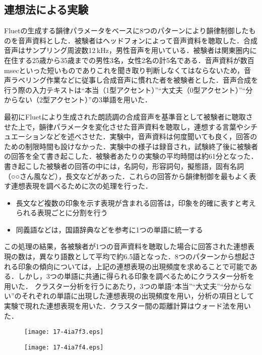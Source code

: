 \documentclass[japanese]{jnlp_1.4}
\begin{document}
\subsection{連想法による実験}

Fluetの生成する韻律パラメータをベースに8つのパターンにより韻律制御したものを音声資料とした．被験者はヘッドフォンによって音声資料を聴取した．合成音声はサンプリング周波数12\,kHz，男性音声を用いている．被験者は関東圏内に在住する25歳から35歳までの男性3名，女性2名の計5名である．音声資料が数百msecといった短いものでありこれを聞き取り判断しなくてはならないため，音声ラベリング作業などに従事し合成音声に慣れた者を被験者とした．音声合成を行う際の入力テキストは“本当（1型アクセント）”“大丈夫（0型アクセント）”“分からない（2型アクセント）”の3単語を用いた．

最初にFluetにより生成された朗読調の合成音声を基準音として被験者に聴取させた上で，韻律パラメータを変化させた音声資料を聴取し，連想する言葉やシチュエーションなどを述べさせた．実験中，音声資料は何度聞いても良く，回答のための制限時間も設けなかった．実験中の様子は録音され，試験終了後に被験者の回答を全て書き起こした．被験者あたりの実験の平均時間は約61分となった．書き起こした被験者の回答の中には，名詞句，形容詞句，擬態語，固有名詞（○○さん風など），長文などがあった．これらの回答から韻律制御を最もよく表す連想表現を調べるために次の処理を行った．

\begin{itemize}
\item 長文など複数の印象を示す表現が含まれる回答は，印象を的確に表すと考えられる表現ごとに分割を行う
\item 同義語などは，国語辞典などを参考に1つの単語に統一する
\end{itemize}

この処理の結果，各被験者が1つの音声資料を聴取した場合に回答された連想表現の数は，異なり語数として平均で約6.5語となった．8つのパターンから想起される印象の傾向については，上記の連想表現の出現頻度を求めることで可能である．しかし，3つの単語に共通に得られる印象を調べるためにクラスター分析\cite{Cluster}を用いた．
クラスター分析を行うにあたり，3つの単語“本当”“大丈夫”“分からない”のそれぞれの単語に出現した連想表現の出現頻度を用い，分析の項目として実験で現れた連想表現を用いた．クラスター間の距離計算はウォード法を用いた．


\begin{figure}[b]
\setlength{\captionwidth}{0.45\textwidth}
 \begin{minipage}{0.45\textwidth}
  \begin{center}
    \texttt{[image: 17-4ia7f3.eps]}
  \end{center}
  \label{fig:one}
 \end{minipage}
\hfill
 \begin{minipage}{0.45\textwidth}
  \begin{center}
    \texttt{[image: 17-4ia7f4.eps]}
  \end{center}
  \label{fig:two}
 \end{minipage}
\end{figure}
\end{document}
